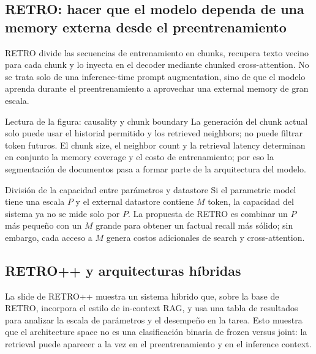 \subsection{RETRO: hacer que el modelo dependa de una memory externa desde el preentrenamiento}

RETRO divide las secuencias de entrenamiento en chunks, recupera texto vecino para cada chunk y lo inyecta en el decoder mediante chunked cross-attention. No se trata solo de una inference-time prompt augmentation, sino de que el modelo aprenda durante el preentrenamiento a aprovechar una external memory de gran escala.


\begin{knowledgebox}{Lectura de la figura: causality y chunk boundary}
La generación del chunk actual solo puede usar el historial permitido y los retrieved neighbors; no puede filtrar token futuros. El chunk size, el neighbor count y la retrieval latency determinan en conjunto la memory coverage y el costo de entrenamiento; por eso la segmentación de documentos pasa a formar parte de la arquitectura del modelo.
\end{knowledgebox}

\begin{importantbox}{División de la capacidad entre parámetros y datastore}
Si el parametric model tiene una escala $P$ y el external datastore contiene $M$ token, la capacidad del sistema ya no se mide solo por $P$. La propuesta de RETRO es combinar un $P$ más pequeño con un $M$ grande para obtener un factual recall más sólido; sin embargo, cada acceso a $M$ genera costos adicionales de search y cross-attention.
\end{importantbox}

\subsection{RETRO++ y arquitecturas híbridas}

La slide de RETRO++ muestra un sistema híbrido que, sobre la base de RETRO, incorpora el estilo de in-context RAG, y usa una tabla de resultados para analizar la escala de parámetros y el desempeño en la tarea. Esto muestra que el architecture space no es una clasificación binaria de frozen versus joint: la retrieval puede aparecer a la vez en el preentrenamiento y en el inference context.

